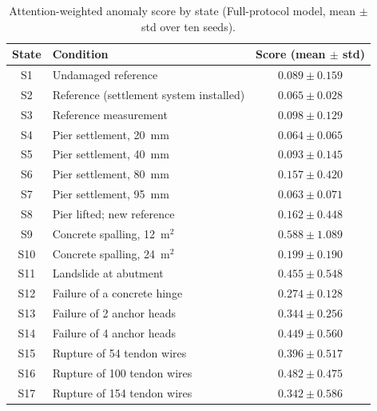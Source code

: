 \documentclass[11pt,a4paper]{article}
\begin{document}
\begin{table}[htbp]
\color{red}
\centering
{}
\caption{Attention-weighted anomaly score by state (Full-protocol model,
mean $\pm$ std over ten seeds).}
\label{tab:perstate}
\small
\begin{tabular}{@{}clc@{}}
\toprule
\textbf{State} & \textbf{Condition} & \textbf{Score (mean $\pm$ std)} \\
\midrule
S1  & Undamaged reference                     & $0.089 \pm 0.159$ \\
S2  & Reference (settlement system installed) & $0.065 \pm 0.028$ \\
S3  & Reference measurement                   & $0.098 \pm 0.129$ \\
S4  & Pier settlement, 20~mm                  & $0.064 \pm 0.065$ \\
S5  & Pier settlement, 40~mm                  & $0.093 \pm 0.145$ \\
S6  & Pier settlement, 80~mm                  & $0.157 \pm 0.420$ \\
S7  & Pier settlement, 95~mm                  & $0.063 \pm 0.071$ \\
S8  & Pier lifted; new reference               & $0.162 \pm 0.448$ \\
\midrule
S9  & Concrete spalling, 12~m$^2$             & $0.588 \pm 1.089$ \\
S10 & Concrete spalling, 24~m$^2$             & $0.199 \pm 0.190$ \\
S11 & Landslide at abutment                   & $0.455 \pm 0.548$ \\
S12 & Failure of a concrete hinge             & $0.274 \pm 0.128$ \\
S13 & Failure of 2 anchor heads               & $0.344 \pm 0.256$ \\
S14 & Failure of 4 anchor heads               & $0.449 \pm 0.560$ \\
S15 & Rupture of 54 tendon wires               & $0.396 \pm 0.517$ \\
S16 & Rupture of 100 tendon wires              & $0.482 \pm 0.475$ \\
S17 & Rupture of 154 tendon wires              & $0.342 \pm 0.586$ \\
\bottomrule
\end{tabular}
\end{table}

\FloatBarrier

\end{document}
